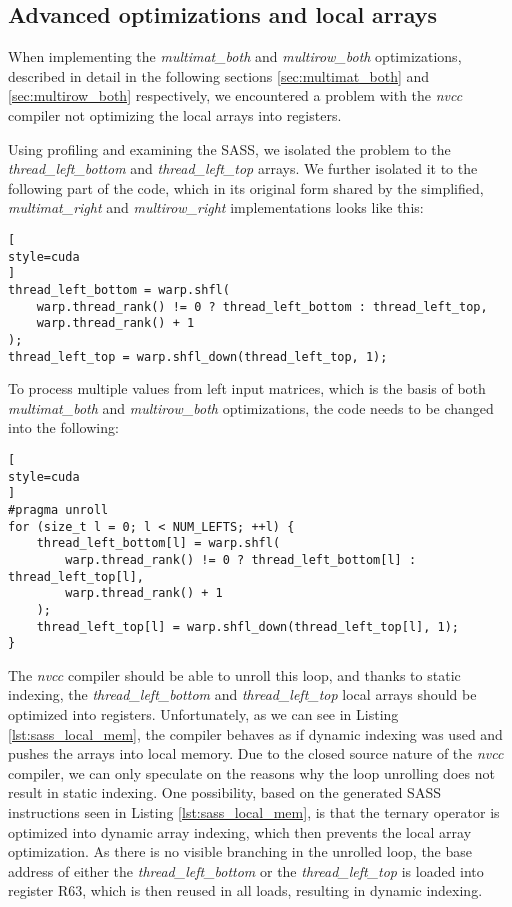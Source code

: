 \subsection{Advanced optimizations and local arrays}
\label{sec:local_array_optimization_code_changes}

When implementing the \textit{multimat\_both} and \textit{multirow\_both} optimizations, described in detail in the following sections \ref{sec:multimat_both} and \ref{sec:multirow_both} respectively, we encountered a problem with the \textit{nvcc} compiler not optimizing the local arrays into registers. 

Using profiling and examining the SASS, we isolated the problem to the \textit{thread\_left\_bottom} and \textit{thread\_left\_top} arrays. We further isolated it to the following part of the code, which in its original form shared by the simplified, \textit{multimat\_right} and \textit{multirow\_right} implementations looks like this:

\begin{lstlisting}[
style=cuda
]
thread_left_bottom = warp.shfl(
	warp.thread_rank() != 0 ? thread_left_bottom : thread_left_top,
	warp.thread_rank() + 1
);
thread_left_top = warp.shfl_down(thread_left_top, 1);
\end{lstlisting}

To process multiple values from left input matrices, which is the basis of both \textit{multimat\_both} and \textit{multirow\_both} optimizations, the code needs to be changed into the following:

\begin{lstlisting}[
style=cuda
]
#pragma unroll
for (size_t l = 0; l < NUM_LEFTS; ++l) {
	thread_left_bottom[l] = warp.shfl(
		warp.thread_rank() != 0 ? thread_left_bottom[l] : thread_left_top[l],
		warp.thread_rank() + 1
	);
	thread_left_top[l] = warp.shfl_down(thread_left_top[l], 1);
}
\end{lstlisting}

The \textit{nvcc} compiler should be able to unroll this loop, and thanks to static indexing, the \textit{thread\_left\_bottom} and \textit{thread\_left\_top} local arrays should be optimized into registers. Unfortunately, as we can see in Listing \ref{lst:sass_local_mem}, the compiler behaves as if dynamic indexing was used and pushes the arrays into local memory. 
Due to the closed source nature of the \textit{nvcc} compiler, we can only speculate on the reasons why the loop unrolling does not result in static indexing. One possibility, based on the generated SASS instructions seen in Listing \ref{lst:sass_local_mem}, is that the ternary operator is optimized into dynamic array indexing, which then prevents the local array optimization. As there is no visible branching in the unrolled loop, the base address of either the \textit{thread\_left\_bottom} or the \textit{thread\_left\_top} is loaded into register R63, which is then reused in all loads, resulting in dynamic indexing. 

